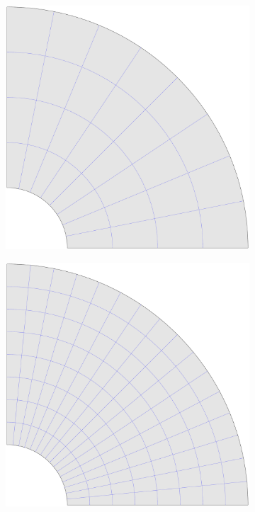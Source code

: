 \begin{figure}
\begin{subfigure}[b]{0.18\linewidth}
    \end{subfigure}
    \begin{subfigure}[b]{0.18\linewidth}        %
        \centering
        \includegraphics[width=\linewidth]{mesh_hole_2}
    \end{subfigure}
    \begin{subfigure}[b]{0.18\linewidth}        %
        \centering
        \includegraphics[width=\linewidth]{mesh_hole_3}

\end{subfigure}
\end{figure}
